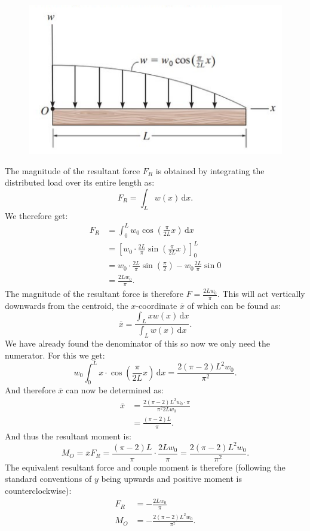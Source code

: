 \documentclass[a4paper]{article}
\begin{document}
\begin{figure} [ht]
  \centering
  \includegraphics[width=0.5\linewidth]{../figures/P3_2.png}
\end{figure}
\bigbreak
The magnitude of the resultant force $F_R$ is obtained by integrating the distributed load over its entire length as:
\[ 
F_R = \int_L w(x) \, \mathrm{d}x
.\]
We therefore get:
\begin{align*}
  F_R &= \int_{0}^{L} w_0 \cos \left( \frac{\pi}{2L} x \right) \, \mathrm{d}x \\
      &= \left[ w_0 \cdot \frac{2L}{\pi} \sin \left( \frac{\pi}{2L} x \right) \right]_{0}^{L} \\
      &= w_0 \cdot \frac{2L}{\pi} \sin \left( \frac{\pi}{2} \right) - w_0 \frac{2L}{\pi} \sin 0 \\
      &= \frac{2L w_0}{\pi}
.\end{align*}
The magnitude of the resultant force is therefore $F = \frac{2L w_0}{\pi}$. This will act vertically downwards from the centroid, the $x$-coordinate $\overline{x}$ of which can be found as:
\[ 
\overline{x} = \frac{\int_L x w(x) \, \mathrm{d}x }{\int_L w(x) \, \mathrm{d}x}
.\]
We have already found the denominator of this so now we only need the numerator. For this we get:
\[ 
  w_0 \int_{0}^{L} x \cdot \cos \left( \frac{\pi}{2L}x \right)\, \mathrm{d}x = \frac{2 \left( \pi - 2 \right)L^2 w_0}{\pi^2}
.\]
And therefore $\overline{x}$ can now be determined as:
\begin{align*}
  \overline{x} &= \frac{2 \left( \pi - 2 \right)L^2 w_0 \cdot \pi}{\pi^2 2L w_0} \\
  &= \frac{\left( \pi - 2 \right)L}{\pi}
.\end{align*}
And thus the resultant moment is:
\[ 
M_O = \overline{x} F_R = \frac{(\pi - 2 ) L}{\pi} \cdot \frac{2 L w_0}{\pi} = \frac{2 \left( \pi - 2 \right)L^2 w_0}{\pi^2}
.\]
The equivalent resultant force and couple moment is therefore (following the standard conventions of $y$ being upwards and positive moment is counterclockwise):
\begin{align*}
  F_R &= -\frac{2L w_0}{\pi} \\
  M_O &= -\frac{2 \left( \pi - 2 \right) L^2 w_0}{\pi^2}
.\end{align*}
\end{document}

